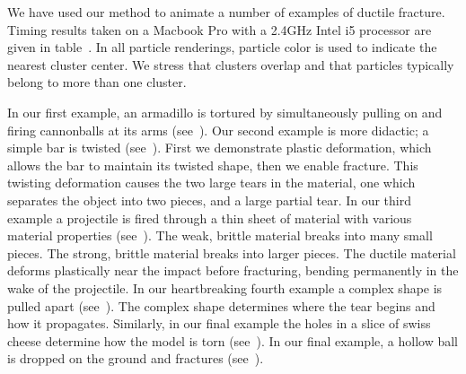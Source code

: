 \documentclass[conference]{acmsiggraph}
\begin{document}
We have used our method to animate a number of examples of ductile fracture.  Timing results
taken on a Macbook Pro with a 2.4GHz Intel i5 processor
are given in table~.
In all particle renderings, particle color is used to indicate the nearest cluster center.  
We stress that clusters overlap and that particles typically belong to more than one cluster.


In our first example, an armadillo is tortured by simultaneously pulling on and firing
cannonballs at its arms (see~).
Our second example is more didactic; a simple bar is twisted (see~).  First we demonstrate 
plastic deformation, which allows the bar to maintain its twisted shape, then we enable fracture.  This twisting deformation causes the two large tears in the material, one which separates the object into two pieces, and a large partial tear.
In our third example a projectile is fired through a thin sheet of material with various material properties (see~).  The weak, brittle material 
breaks into many small pieces.  The strong, brittle material breaks into larger pieces.  The ductile material deforms plastically near the impact before fracturing, bending permanently in the wake of the projectile.  
In our heartbreaking fourth example a complex shape is pulled apart (see~).  The complex shape determines
where the tear begins and how it propagates.  Similarly, in our final example the holes in a 
slice of swiss cheese determine how the model is torn (see~).
In our final example, a hollow ball is dropped on the ground and fractures (see~).

\end{document}
